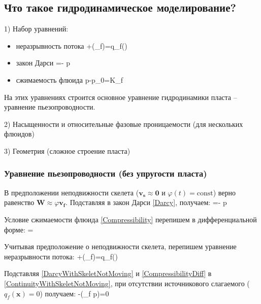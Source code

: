 \documentclass[main.tex]{subfiles}
\begin{document}
\subsection{Что такое гидродинамическое моделирование?}
1) Набор уравнений:
\begin{itemize}
	\item неразрывность потока
	\beq\label{Continuity}
	+\pmb{\nabla}\cdot\left(\rho_f\varphi {}\right)=q_f()
	\eeq
	\item закон Дарси
	\beq\label{Darcy}
	=-\cdot\pmb{\nabla} p
	\eeq
	\item сжимаемость флюида
	\beq\label{Compressibility}
	p-p_0=K_f
	\eeq
\end{itemize}

На этих уравнениях строится основное уравнение гидродинамики пласта -- уравнение пьезопроводности.

2) Насыщенности и относительные фазовые проницаемости (для нескольких флюидов)

3) Геометрия (сложное строение пласта)

\subsubsection{Уравнение пьезопроводности (без упругости пласта)}

В предположении неподвижности скелета ($\pmb{v_s}\approx \pmb{0}$ и $\varphi(t)=\textrm{const}$) верно равенство $\pmb{W}\approx\varphi \pmb{v_f}$. Подставляя в закон Дарси \eqref{Darcy}, получаем:
\beq\label{DarcyWithSkeletNotMoving}
\varphi {}=-\cdot\pmb{\nabla} p
\eeq

Условие сжимаемости флюида \eqref{Compressibility} перепишем в дифференциальной форме:
\beq\label{CompressibilityDiff}
=
\eeq

Учитывая предположение о неподвижности скелета, перепишем уравнение неразрывности потока:
\beq\label{ContinuityWithSkeletNotMoving}
\varphi{}+\pmb{\nabla}\cdot\left(\rho_f\varphi{}\right)=q_f()
\eeq

Подставляя \eqref{DarcyWithSkeletNotMoving} и \eqref{CompressibilityDiff} в \eqref{ContinuityWithSkeletNotMoving}, при отсутствии источникового слагаемого ($q_f(\pmb{x})=0$) получаем:
\beq
\varphi{}-\pmb{\nabla}\cdot\left(\rho_f\pmb{\nabla} p\right)=0
\eeq
\end{document}
